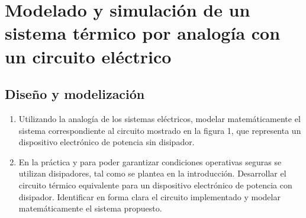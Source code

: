\section{Modelado y simulación de un sistema térmico por analogía con un circuito eléctrico}
\subsection{Diseño y modelización} \label{modelado}
\begin{enumerate}
   \item Utilizando la analogía de los sistemas eléctricos, modelar matemáticamente el sistema correspondiente al circuito mostrado en la figura 1, que representa un dispositivo electrónico de potencia sin disipador.
   \item En la práctica y para poder garantizar condiciones operativas seguras se utilizan disipadores, tal como se plantea en la introducción. Desarrollar el circuito térmico equivalente para un dispositivo electrónico de potencia con disipador. Identificar en forma clara el circuito implementado y modelar matemáticamente el sistema propuesto.
\end{enumerate}
